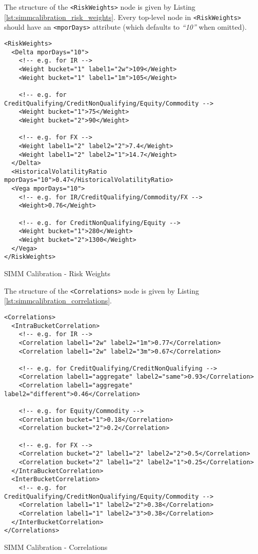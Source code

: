 The structure of the {\tt <RiskWeights>} node is given by Listing \ref{lst:simmcalibration_risk_weights}.
Every top-level node in {\tt <RiskWeights>} should have an {\tt <mporDays>} attribute (which defaults to
\emph{``10''} when omitted).

\begin{listing}[H]
\begin{verbatim}
<RiskWeights>
  <Delta mporDays="10">
    <!-- e.g. for IR -->
    <Weight bucket="1" label1="2w">109</Weight>
    <Weight bucket="1" label1="1m">105</Weight>

    <!-- e.g. for CreditQualifying/CreditNonQualifying/Equity/Commodity -->
    <Weight bucket="1">75</Weight>
    <Weight bucket="2">90</Weight>

    <!-- e.g. for FX -->
    <Weight label1="2" label2="2">7.4</Weight>
    <Weight label1="2" label2="1">14.7</Weight>
  </Delta>
  <HistoricalVolatilityRatio mporDays="10">0.47</HistoricalVolatilityRatio>
  <Vega mporDays="10">
    <!-- e.g. for IR/CreditQualifying/Commodity/FX -->
    <Weight>0.76</Weight>

    <!-- e.g. for CreditNonQualifying/Equity -->
    <Weight bucket="1">280</Weight>
    <Weight bucket="2">1300</Weight>
  </Vega>
</RiskWeights>
\end{verbatim}
\caption{SIMM Calibration - Risk Weights}
\label{lst:simmcalibration_risk_weights}
\end{listing}

The structure of the {\tt <Correlations>} node is given by Listing \ref{lst:simmcalibration_correlations}.

\begin{listing}[H]
\begin{verbatim}
<Correlations>
  <IntraBucketCorrelation>
    <!-- e.g. for IR -->
    <Correlation label1="2w" label2="1m">0.77</Correlation>
    <Correlation label1="2w" label2="3m">0.67</Correlation>

    <!-- e.g. for CreditQualifying/CreditNonQualifying -->
    <Correlation label1="aggregate" label2="same">0.93</Correlation>
    <Correlation label1="aggregate" label2="different">0.46</Correlation>

    <!-- e.g. for Equity/Commodity -->
    <Correlation bucket="1">0.18</Correlation>
    <Correlation bucket="2">0.2</Correlation>

    <!-- e.g. for FX -->
    <Correlation bucket="2" label1="2" label2="2">0.5</Correlation>
    <Correlation bucket="2" label1="2" label2="1">0.25</Correlation>
  </IntraBucketCorrelation>
  <InterBucketCorrelation>
    <!-- e.g. for CreditQualifying/CreditNonQualifying/Equity/Commodity -->
    <Correlation label1="1" label2="2">0.38</Correlation>
    <Correlation label1="1" label2="3">0.38</Correlation>
  </InterBucketCorrelation>
</Correlations>
\end{verbatim}
\caption{SIMM Calibration - Correlations}
\label{lst:simmcalibration_correlations}
\end{listing}

